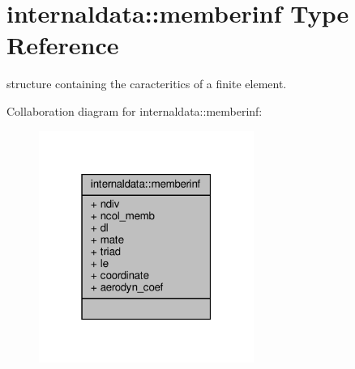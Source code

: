 \hypertarget{structinternaldata_1_1memberinf}{}\section{internaldata\+:\+:memberinf Type Reference}
\label{structinternaldata_1_1memberinf}


structure containing the caracteritics of a finite element.  




Collaboration diagram for internaldata\+:\+:memberinf\+:\nopagebreak
\begin{figure}[H]
\begin{center}
\leavevmode
\includegraphics[width=199pt]{structinternaldata_1_1memberinf__coll__graph}
\end{center}
\end{figure}
